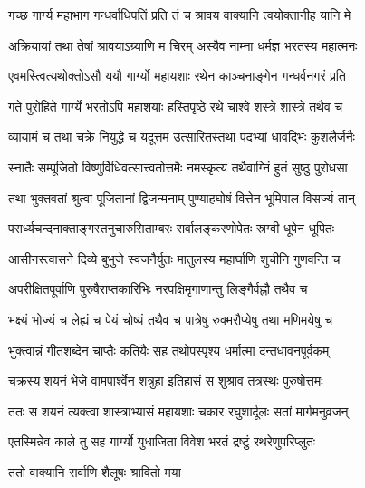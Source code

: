 
\twolineshloka
{गच्छ गार्ग्य महाभाग गन्धर्वाधिपतिं प्रति}
{तं च श्रावय वाक्यानि त्वयोक्तानीह यानि मे}%

\twolineshloka
{अक्रियायां तथा तेषां श्रावयाऽग्र्याणि म चिरम्}
{अस्यैव नाम्ना धर्मज्ञ भरतस्य महात्मनः} %


\twolineshloka
{एवमस्त्वित्यथोक्तोऽसौ ययौ गार्ग्यो महायशाः}
{रथेन काञ्चनाङ्गेन गन्धर्वनगरं प्रति}%

\twolineshloka
{गते पुरोहिते गार्ग्ये भरतोऽपि महाशयाः}
{हस्तिपृष्ठे रथे चाश्वे शस्त्रे शास्त्रे तथैव च}%

\twolineshloka
{व्यायामं च तथा चक्रे नियुद्धे च यदूत्तम}
{उत्सारितस्तथा पदभ्यां धावद्भिः कुशलैर्जनैः}%

\twolineshloka
{स्नातैः सम्पूजितो विष्णुर्विधिवत्सात्त्वतोत्तमैः}
{नमस्कृत्य तथैवाग्निं हुतं सुष्ठु पुरोधसा}%

\twolineshloka
{तथा भुक्तवतां श्रुत्वा पूजितानां द्विजन्मनाम्}
{पुण्याहघोषं वित्तेन भूमिपाल विसर्ज्य तान्}%

\twolineshloka
{परार्ध्यचन्दनाक्ताङ्गस्तनुचारुसिताम्बरः}
{सर्वालङ्करणोपेतः स्रग्वी धूपेन धूपितः}%

\twolineshloka
{आसीनस्त्वासने दिव्ये बुभुजे स्वजनैर्युतः}
{मातुलस्य महार्घाणि शुचीनि गुणवन्ति च}%

\twolineshloka
{अपरीक्षितपूर्वाणि पुरुषैराप्तकारिभिः}
{नरपक्षिमृगाणान्तु लिङ्गैर्वह्नौ तथैव च}%

\twolineshloka
{भक्ष्यं भोज्यं च लेह्यं च पेयं चोष्यं तथैव च}
{पात्रेषु रुक्मरौप्येषु तथा मणिमयेषु च}%

\twolineshloka
{भुक्त्वान्नं गीतशब्देन चाप्तैः कतियैः सह}
{तथोपस्पृश्य धर्मात्मा दन्तधावनपूर्वकम्} %

\twolineshloka
{चक्रस्य शयनं भेजे वामपार्श्वेन शत्रुहा}
{इतिहासं स शुश्राव तत्रस्थः पुरुषोत्तमः}%

\twolineshloka
{ततः स शयनं त्यक्त्वा शास्त्राभ्यासं महायशाः}
{चकार रघुशार्दूलः सतां मार्गमनुव्रजन्}%

\twolineshloka
{एतस्मिन्नेव काले तु सह गार्ग्यो युधाजिता}
{विवेश भरतं द्रष्टुं रथरेणुपरिप्लुतः}%


\onelineshloka
{ततो वाक्यानि सर्वाणि शैलूषः श्रावितो मया}%

